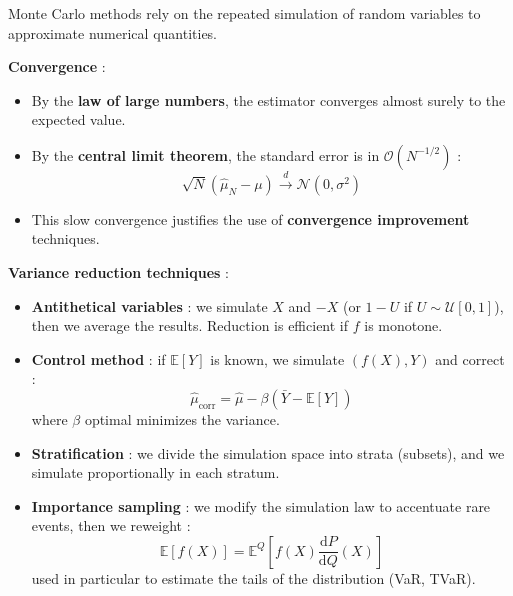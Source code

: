 \begin{f}

Monte Carlo methods rely on the repeated simulation of random variables to approximate numerical quantities.

\textbf{Convergence} :
\begin{itemize}[nosep]
	\item By the \textbf{law of large numbers}, the estimator converges almost surely to the expected value.
	\item By the \textbf{central limit theorem}, the standard error is in \(\mathcal{O}(N^{-1/2})\) :
	\[
	\sqrt{N}(\hat{\mu}_N - \mu) \xrightarrow{d} \mathcal{N}(0, \sigma^2)
	\]
	\item This slow convergence justifies the use of \textbf{convergence improvement} techniques.
\end{itemize}

\textbf{Variance reduction techniques} :
\begin{itemize}
	\item \textbf{Antithetical variables} : we simulate \(X\) and \(-X\) (or \(1-U\) if \(U \sim \mathcal{U}[0,1]\)), then we average the results. Reduction is efficient if \(f\) is monotone.
	\item \textbf{Control method} : if \(\mathbb{E}[Y]\) is known, we simulate \((f(X), Y)\) and correct :
	\[
	\hat{\mu}_\text{corr} = \hat{\mu} - \beta(\bar{Y} - \mathbb{E}[Y])
	\]
	where \(\beta\) optimal minimizes the variance.
	\item \textbf{Stratification} : we divide the simulation space into strata (subsets), and we simulate proportionally in each stratum.
	\item \textbf{Importance sampling} : we modify the simulation law to accentuate rare events, then we reweight :
	\[
	\mathbb{E}[f(X)] = \mathbb{E}^{Q}\left[f(X) \frac{\mathrm{d}P}{\mathrm{d}Q}(X)\right]
	\]
	used in particular to estimate the tails of the distribution (VaR, TVaR).
\end{itemize}

\end{f}
